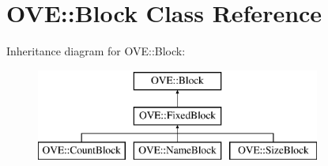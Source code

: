 \hypertarget{class_o_v_e_1_1_block}{}\section{O\+VE\+:\+:Block Class Reference}
\label{class_o_v_e_1_1_block}
Inheritance diagram for O\+VE\+:\+:Block\+:\begin{figure}[H]
\begin{center}
\leavevmode
\includegraphics[height=3.000000cm]{class_o_v_e_1_1_block}
\end{center}
\end{figure}
